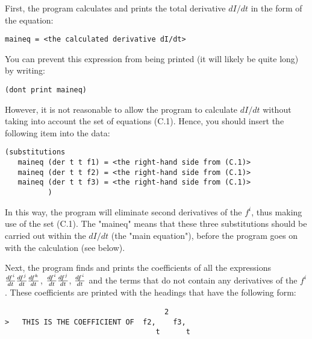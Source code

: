 First, the program calculates and prints the total derivative $dI/dt$ in the
form of the equation:

\bigskip

\begin{verbatim}
maineq = <the calculated derivative dI/dt>
\end{verbatim}

\bigskip

\noindent You can prevent this expression from being printed (it will likely be
quite long) by writing:

\bigskip

\begin{verbatim}
(dont print maineq)
\end{verbatim}

\bigskip

\noindent However, it is not reasonable to allow the program to calculate
$dI/dt$ without taking into account the set of equations (C.1). Hence, you
should insert the following item into the data:

\bigskip

\begin{verbatim}
(substitutions
   maineq (der t t f1) = <the right-hand side from (C.1)>
   maineq (der t t f2) = <the right-hand side from (C.1)>
   maineq (der t t f3) = <the right-hand side from (C.1)>
          )
\end{verbatim}

\bigskip

\noindent In this way, the program will eliminate second derivatives of the
$f^i$, thus making use of the set (C.1). The "maineq" means that these three
substitutions should be carried out within the $dI/dt$ (the "main equation"),
before the program goes on with the calculation (see below).

Next, the program finds and prints the coefficients of all the expressions ${{d
f^i} \over {dt}} {{d f^j} \over {dt}} {{d f^k} \over {dt}}$, ${{d f^i} \over
{dt}} {{d f^j} \over {dt}}$, ${{d f^i} \over {dt}}$ and the terms that do not
contain any derivatives of the $f^i$. These coefficients are printed with the
headings that have the following form:
\bigskip

\begin{verbatim}
                                     2
>   THIS IS THE COEFFICIENT OF  f2,    f3,
                                   t      t
\end{verbatim}

\bigskip

